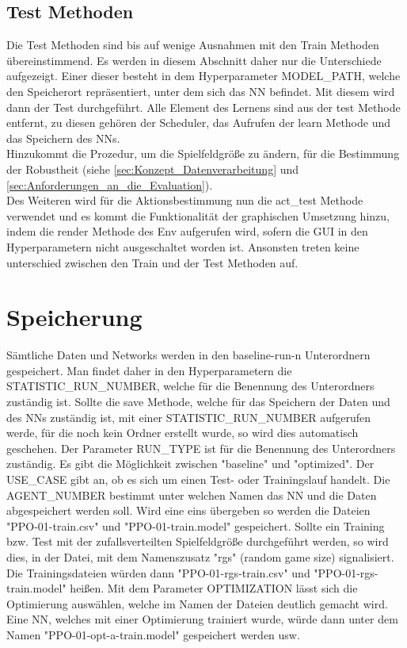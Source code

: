 \subsection{Test Methoden}
Die Test Methoden sind bis auf wenige Ausnahmen mit den Train Methoden übereinstimmend. Es werden in diesem Abschnitt daher nur die Unterschiede aufgezeigt. Einer dieser besteht in dem Hyperparameter MODEL\_PATH, welche den Speicherort repräsentiert, unter dem sich das NN befindet. Mit diesem wird dann der Test durchgeführt. Alle Element des Lernens sind aus der test Methode entfernt, zu diesen gehören der Scheduler, das Aufrufen der learn Methode und das Speichern des NNs.\\
Hinzukommt die Prozedur, um die Spielfeldgröße zu ändern, für die Bestimmung der Robustheit (siehe \ref{sec:Konzept_Datenverarbeitung} und \ref{sec:Anforderungen_an_die_Evaluation}).\\
Des Weiteren wird für die Aktionsbestimmung nun die act\_test Methode verwendet und es kommt die Funktionalität der graphischen Umsetzung hinzu, indem die render Methode des Env aufgerufen wird, sofern die GUI in den Hyperparametern nicht ausgeschaltet worden ist.
Ansonsten treten keine unterschied zwischen den Train und der Test Methoden auf.

\section{Speicherung}
Sämtliche Daten und Networks werden in den baseline-run-n Unterordnern gespeichert. Man findet daher in den Hyperparametern die STATISTIC\_RUN\_NUMBER, welche für die Benennung des Unterordners zuständig ist. Sollte die save Methode, welche für das Speichern der Daten und des NNs zuständig ist, mit einer STATISTIC\_RUN\_NUMBER aufgerufen werde, für die noch kein Ordner erstellt wurde, so wird dies automatisch geschehen. Der Parameter RUN\_TYPE ist für die Benennung des Unterordners zuständig. Es gibt die Möglichkeit zwischen "baseline" und "optimized". Der USE\_CASE gibt an, ob es sich um einen Test- oder Trainingslauf handelt. Die AGENT\_NUMBER bestimmt unter welchen Namen das NN und die Daten abgespeichert werden soll. Wird eine eins übergeben so werden die Dateien "PPO-01-train.csv" und "PPO-01-train.model" gespeichert. Sollte ein Training bzw. Test mit der zufallsverteilten Spielfeldgröße durchgeführt werden, so wird dies, in der Datei, mit dem Namenszusatz "rgs" (random game size) signalisiert. Die Trainingsdateien würden dann "PPO-01-rgs-train.csv" und "PPO-01-rgs-train.model" heißen. Mit dem Parameter OPTIMIZATION lässt sich die Optimierung auswählen, welche im Namen der Dateien deutlich gemacht wird. Eine NN, welches mit einer Optimierung trainiert wurde, würde dann unter dem Namen "PPO-01-opt-a-train.model" gespeichert werden usw.

